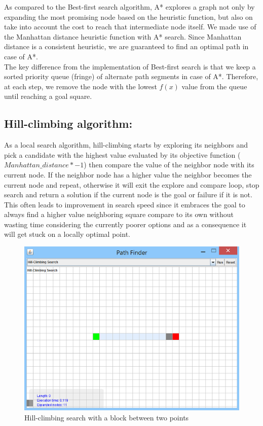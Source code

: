 \documentclass[a4paper]{article}
\begin{document}
As compared to the Best-first search algorithm, A* explores a graph not only by expanding the most promising node based on the heuristic function, but also on take into account the cost to reach that intermediate node itself. We made use of the Manhattan distance heuristic function with A* search. Since Manhattan distance is a consistent heuristic, we are guaranteed to find an optimal path in case of A*. \\

The key difference from the implementation of Best-first search is that we keep a sorted priority queue (fringe) of alternate path segments in case of A*. Therefore, at each step, we remove the node with the lowest $f(x)$ value from the queue until reaching a goal square.


\subsection{Hill-climbing algorithm:}

As a local search algorithm, hill-climbing starts by exploring its neighbors and pick a candidate with the highest value evaluated by its objective function ($Manhattan\_distance * -1$) then compare the value of the neighbor node with its current node. If the neighbor node has a higher value the neighbor becomes the current node and repeat, otherwise it will exit the explore and compare loop, stop search and return a solution if the current node is the goal or failure if it is not. This often leads to improvement in search speed since it embraces the goal to always find a higher value neighboring square compare to its own without wasting time considering the currently poorer options and as a consequence it will get stuck on a locally optimal point. \\

\begin{figure}[h!]
  \centering
    \includegraphics[scale=.9]{images/hillclimb1.png}
  \caption{Hill-climbing search with a block between two points}
  \label{fig:hillClimbing}
\end{figure}
\end{document}
